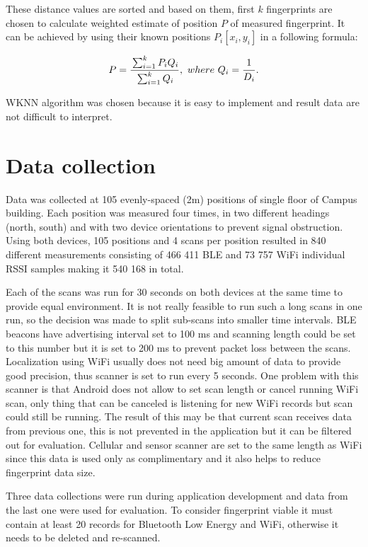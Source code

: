 These distance values are sorted and based on them, first $k$ fingerprints are chosen to calculate weighted estimate of position $P$ of measured fingerprint. It can be achieved by using their known positions $P_i[x_i,y_i]$ in a following formula:

$$ P = 
\frac
	{\strut\sum_{i=1}^{k} P_i Q_i}
	{\strut\sum_{i=1}^{k} Q_i},\
where\
	Q_i = \frac{\strut 1}{\strut D_i}.$$

WKNN algorithm was chosen because it is easy to implement and result data are not difficult to interpret.

\section{Data collection}\label{sec:DataCollection}
Data was collected at 105 evenly-spaced (2m) positions of single floor of Campus building. Each position was measured four times, in two different headings (north, south) and with two device orientations to prevent signal obstruction. Using both devices, 105 positions and 4 scans per position resulted in 840 different measurements consisting of 466 411 BLE and 73 757 WiFi individual RSSI samples making it 540 168 in total.

Each of the scans was run for 30 seconds on both devices at the same time to provide equal environment. It is not really feasible to run such a long scans in one run, so the decision was made to split sub-scans into smaller time intervals. BLE beacons have advertising interval set to 100 ms and scanning length could be set to this number but it is set to 200 ms to prevent packet loss between the scans. Localization using WiFi usually does not need big amount of data to provide good precision, thus scanner is set to run every 5 seconds. One problem with this scanner is that Android does not allow to set scan length or cancel running WiFi scan, only thing that can be canceled is listening for new WiFi records but scan could still be running. The result of this may be that current scan receives data from previous one, this is not prevented in the application but it can be filtered out for evaluation. Cellular and sensor scanner are set to the same length as WiFi since this data is used only as complimentary and it also helps to reduce fingerprint data size.

Three data collections were run during application development and data from the last one were used for evaluation. To consider fingerprint viable it must contain at least 20 records for Bluetooth Low Energy and WiFi, otherwise it needs to be deleted and re-scanned.


